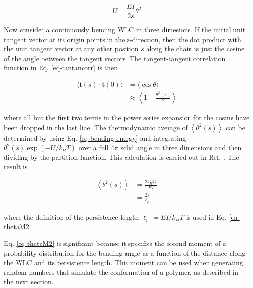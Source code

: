 \documentclass[12pt, a4paper]{article}
\begin{document}
\begin{equation}
\label{eq-bending-energy}
  U = \frac{EI}{2s}\theta^{2}
\end{equation}

Now consider a continuously bending WLC in three dimesions. If the
initial unit tangent vector at its origin points in the
z-direction, then the dot product with the unit tangent vector at
any other position $s$ along the chain is just the cosine of the
angle between the tangent vectors. The tangent-tangent correlation
function in Eq. \eqref{eq-tantancorr} is then

\begin{align}
  \langle \mathbf{t} \left( s \right) \cdot \mathbf{t} \left( 0 \right) \rangle &= \langle \cos \theta\rangle \\
  &\approx \left< 1 - \frac{\theta^2 \left( s\right) }{2} \right> \label{eq-cosineseries}
\end{align}

where all but the first two terms in the power series expansion
for the cosine have been dropped in the last line. The
thermodynamic average of $\left< \theta^2 \left( s \right)
    \right>$ can be determined by using Eq. \eqref{eq-bending-energy}
and integrating $\theta^2 \left( s \right) \exp \left( -U /
    k_{B}T\right)$ over a full $4 \pi$ solid angle in three dimensions
and then dividing by the partition function. This calculation is
carried out in Ref. \cite{phillips-pbotc-2009}. The result is

\begin{align}
  \left< \theta^2 \left( s \right) \right> &= \frac{2 k_{B} Ts}{EI} \\
  &= \frac{2s}{\ell_p} \label{eq-thetaM2}
\end{align}

where the definition of the persistence length $\ell_p \coloneqq
    EI/k_{B}T$ is used in Eq. \eqref{eq-thetaM2}.

Eq. \eqref{eq-thetaM2} is significant because it specifies the
second moment of a probability distribution for the bending angle
as a function of the distance along the WLC and its persistence
length. This moment can be used when generating random numbers
that simulate the conformation of a polymer, as described in the
next section.
\end{document}
